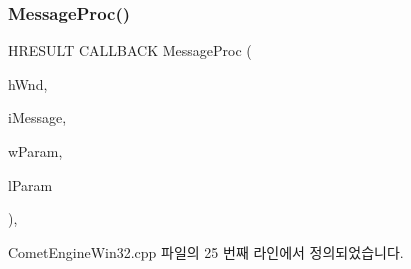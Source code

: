 \subsubsection{\texorpdfstring{Message\+Proc()}{MessageProc()}}
{\footnotesize\ttfamily H\+R\+E\+S\+U\+LT C\+A\+L\+L\+B\+A\+CK Message\+Proc (\begin{DoxyParamCaption}\item[{H\+W\+ND}]{h\+Wnd,  }\item[{U\+I\+NT}]{i\+Message,  }\item[{W\+P\+A\+R\+AM}]{w\+Param,  }\item[{L\+P\+A\+R\+AM}]{l\+Param }\end{DoxyParamCaption})\hspace{0.3cm}{\ttfamily [static]}, {\ttfamily [private]}}



Comet\+Engine\+Win32.\+cpp 파일의 25 번째 라인에서 정의되었습니다.



